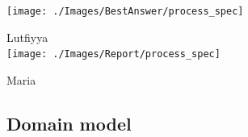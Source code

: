 \documentclass[a4paper,11pt]{article}
\begin{document}
\begin{center}
\texttt{[image: ./Images/BestAnswer/process\_spec]}
\end{center}

Lutfiyya\\
\texttt{[image: ./Images/Report/process\_spec]}

Maria\\

\subsection{Domain model}
\end{document}
